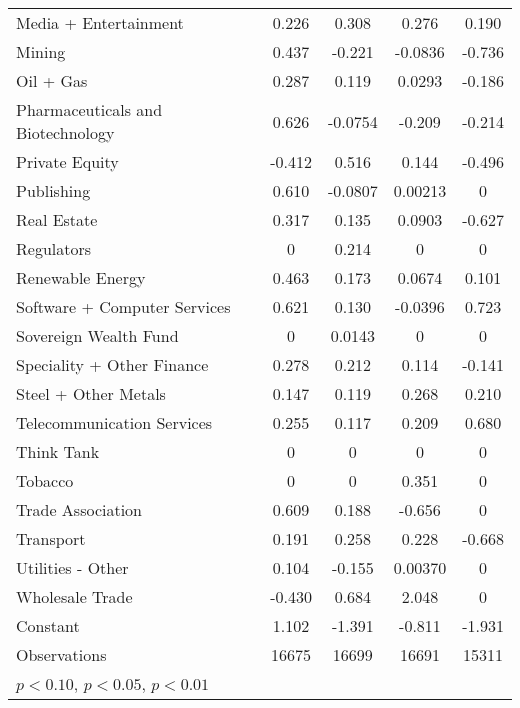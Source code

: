 {\begin{longtable}{l*{4}{c}}
Media + Entertainment&    0.226         &    0.308         &    0.276\sym{*}  &    0.190         \\
Mining          &    0.437\sym{**} &   -0.221         &  -0.0836         &   -0.736\sym{**} \\
Oil + Gas       &    0.287         &    0.119         &   0.0293         &   -0.186         \\
Pharmaceuticals and Biotechnology&    0.626\sym{***}&  -0.0754         &   -0.209         &   -0.214         \\
Private Equity  &   -0.412\sym{**} &    0.516\sym{**} &    0.144         &   -0.496         \\
Publishing      &    0.610         &  -0.0807         &  0.00213         &        0         \\
Real Estate     &    0.317\sym{*}  &    0.135         &   0.0903         &   -0.627\sym{*}  \\
Regulators      &        0         &    0.214         &        0         &        0         \\
Renewable Energy&    0.463\sym{**} &    0.173         &   0.0674         &    0.101         \\
Software + Computer Services&    0.621\sym{***}&    0.130         &  -0.0396         &    0.723\sym{**} \\
Sovereign Wealth Fund&        0         &   0.0143         &        0         &        0         \\
Speciality + Other Finance&    0.278\sym{*}  &    0.212         &    0.114         &   -0.141         \\
Steel + Other Metals&    0.147         &    0.119         &    0.268         &    0.210         \\
Telecommunication Services&    0.255         &    0.117         &    0.209         &    0.680\sym{**} \\
Think Tank      &        0         &        0         &        0         &        0         \\
Tobacco         &        0         &        0         &    0.351         &        0         \\
Trade Association&    0.609         &    0.188         &   -0.656\sym{*}  &        0         \\
Transport       &    0.191         &    0.258         &    0.228         &   -0.668         \\
Utilities - Other&    0.104         &   -0.155         &  0.00370         &        0         \\
Wholesale Trade &   -0.430         &    0.684         &    2.048\sym{***}&        0         \\
Constant        &    1.102\sym{***}&   -1.391\sym{***}&   -0.811\sym{***}&   -1.931\sym{***}\\
\midrule
Observations    &    16675         &    16699         &    16691         &    15311         \\
\bottomrule
\multicolumn{5}{l}{\footnotesize \sym{*} \(p<0.10\), \sym{**} \(p<0.05\), \sym{***} \(p<0.01\)}\\
\end{longtable}
}
